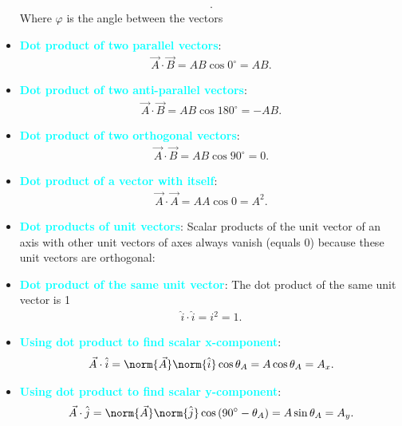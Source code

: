 \documentclass{report}
\begin{document}
\begin{itemize}
\begin{align*}
        .\end{align*}
        Where $\varphi$ is the angle between the vectors
    \item \textbf{\textcolor{cyan}{Dot product of two parallel vectors}}:
        \begin{align*}
            \vec{A} \cdot \vec{B} = AB\cos{0^{\circ}} = AB
        .\end{align*}
    \item \textbf{\textcolor{cyan}{Dot product of two anti-parallel vectors}}:
        \begin{align*}
            \vec{A} \cdot \vec{B} = AB\cos{180^{\circ}} = -AB
        .\end{align*}
    \item \textbf{\textcolor{cyan}{Dot product of two orthogonal vectors}}:
        \begin{align*}
            \vec{A} \cdot \vec{B} = AB\cos{90^{\circ}} =  0
        .\end{align*}
    \item \textbf{\textcolor{cyan}{Dot product of a vector with itself}}:
        \begin{align*}
            \vec{A} \cdot \vec{A} = AA\cos{0} = A^{2}
        .\end{align*}
    \item \textbf{\textcolor{cyan}{Dot products of unit vectors}}: Scalar products of the unit vector of an axis with other unit vectors of axes always vanish (equals 0) because these unit vectors are orthogonal:
    \item \textbf{\textcolor{cyan}{Dot product of the same unit vector}}: The dot product of the same unit vector is 1
        \begin{align*}
            \hat{i} \cdot \hat{i} = i^{2} = 1
        .\end{align*}
    \item \textbf{\textcolor{cyan}{Using dot product to find scalar x-component}}:
        \begin{align*}
            \vec{A} \cdot \hat{i} = \norm{\vec{A}} \norm{\hat{i}}\cos{\theta_{A}} = A\cos{\theta_{A}}= A_{x}
        .\end{align*}
    \item \textbf{\textcolor{cyan}{Using dot product to find scalar y-component}}:
        \begin{align*}
            \vec{A} \cdot \hat{j} = \norm{\vec{A}} \norm{\hat{j}}\cos{(90^{\circ} -\theta_{A})}= A\sin{\theta_{A}} = A_{y}
        .\end{align*}

\end{itemize}
\end{document}
